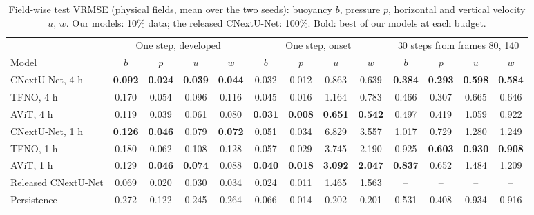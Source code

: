 \documentclass[11pt]{article}
\begin{document}
\begin{table}[!htbp]
\centering\footnotesize
\setlength{\tabcolsep}{3.2pt}
\begin{tabular}{@{}lcccccccccccc@{}}
\toprule
& \multicolumn{4}{c}{One step, developed} & \multicolumn{4}{c}{One step, onset} & \multicolumn{4}{c}{30 steps from frames 80, 140} \\
\cmidrule(lr){2-5}\cmidrule(lr){6-9}\cmidrule(l){10-13}
Model & $b$ & $p$ & $u$ & $w$ & $b$ & $p$ & $u$ & $w$ & $b$ & $p$ & $u$ & $w$ \\
\midrule
CNextU-Net, 4 h & \textbf{0.092} & \textbf{0.024} & \textbf{0.039} & \textbf{0.044} & 0.032 & 0.012 & 0.863 & 0.639 & \textbf{0.384} & \textbf{0.293} & \textbf{0.598} & \textbf{0.584} \\
TFNO, 4 h & 0.170 & 0.054 & 0.096 & 0.116 & 0.045 & 0.016 & 1.164 & 0.783 & 0.466 & 0.307 & 0.665 & 0.646 \\
AViT, 4 h & 0.119 & 0.039 & 0.061 & 0.080 & \textbf{0.031} & \textbf{0.008} & \textbf{0.651} & \textbf{0.542} & 0.497 & 0.419 & 1.059 & 0.922 \\
\midrule
CNextU-Net, 1 h & \textbf{0.126} & \textbf{0.046} & 0.079 & \textbf{0.072} & 0.051 & 0.034 & 6.829 & 3.557 & 1.017 & 0.729 & 1.280 & 1.249 \\
TFNO, 1 h & 0.180 & 0.062 & 0.108 & 0.128 & 0.057 & 0.029 & 3.745 & 2.190 & 0.925 & \textbf{0.603} & \textbf{0.930} & \textbf{0.908} \\
AViT, 1 h & 0.129 & \textbf{0.046} & \textbf{0.074} & 0.088 & \textbf{0.040} & \textbf{0.018} & \textbf{3.092} & \textbf{2.047} & \textbf{0.837} & 0.652 & 1.484 & 1.209 \\
\midrule
Released CNextU-Net & 0.069 & 0.020 & 0.030 & 0.034 & 0.024 & 0.011 & 1.465 & 1.563 & -- & -- & -- & -- \\
Persistence & 0.272 & 0.122 & 0.245 & 0.264 & 0.066 & 0.014 & 0.202 & 0.201 & 0.531 & 0.408 & 0.934 & 0.916 \\
\bottomrule
\end{tabular}
\caption{Field-wise test VRMSE (physical fields, mean over the two seeds): buoyancy $b$, pressure $p$, horizontal
and vertical velocity $u$, $w$. Our models: 10\% data; the released CNextU-Net: 100\%. Bold: best of our
models at each budget.}
\label{tab:fields}
\end{table}
\end{document}
